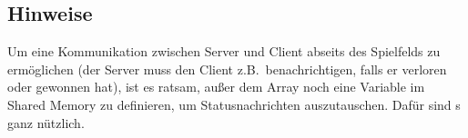 \subsection*{Hinweise}
Um eine Kommunikation zwischen Server und Client abseits des Spielfelds zu
ermöglichen (der Server muss den Client z.B.\ benachrichtigen, falls er verloren
oder gewonnen hat), ist es ratsam, außer dem Array noch eine Variable im Shared
Memory zu definieren, um Statusnachrichten auszutauschen. Dafür sind
s ganz nützlich.

\osueguidelinesthree



